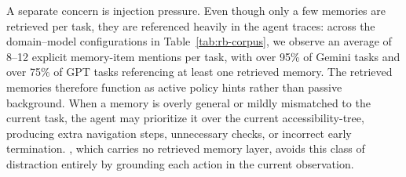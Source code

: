 \begin{table}[ht]
\centering
{}
\caption{\textbf{ReasoningBank memory-corpus statistics} on WebArena, averaged over three runs. Tasks processed per run: 187 (Shopping), 106 (Reddit), 182 (Admin). \emph{Succ.-labeled}: tasks labeled successful by the judge. \emph{FP in succ.}: fraction of success-labeled tasks from trajectories that failed according to the ground-truth evaluator. \emph{FN in fail}: fraction of fail-labeled tasks from trajectories that succeeded according to the ground-truth evaluator.}

\label{tab:rb-corpus}
\end{table}

A separate concern is injection pressure.
Even though only a few memories are retrieved per task, they are referenced heavily in the agent traces: across the domain--model configurations in Table~\ref{tab:rb-corpus}, we observe an average of 8--12 explicit memory-item mentions per task, with over 95\% of Gemini tasks and over 75\% of GPT tasks referencing at least one retrieved memory.
The retrieved memories therefore function as active policy hints rather than passive background.
When a memory is overly general or mildly mismatched to the current task, the agent may prioritize it over the current accessibility-tree, producing extra navigation steps, unnecessary checks, or incorrect early termination.
\budgetactor{}, which carries no retrieved memory layer, avoids this class of distraction entirely by grounding each action in the current observation.

